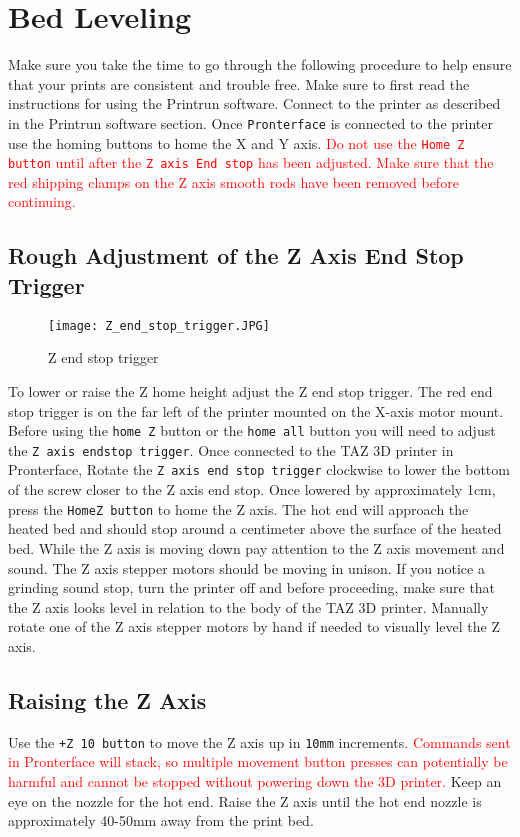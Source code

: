 \section{Bed Leveling}
Make sure you take the time to go through the following procedure to help ensure that your prints are consistent and trouble free. Make sure to first read the instructions for using the Printrun software. Connect to the printer as described in the Printrun software section. Once \texttt{Pronterface} is connected to the printer use the homing buttons to home the X and Y axis. \textcolor{red}{Do not use the \texttt{Home Z button} until after the \texttt{Z axis End stop} has been adjusted. Make sure that the red shipping clamps on the Z axis smooth rods have been removed before continuing.}

\subsection{Rough Adjustment of the Z Axis End Stop Trigger}
\begin{figure}[H]
\centering
\texttt{[image: Z\_end\_stop\_trigger.JPG]}
\caption{Z end stop trigger}
\label{fig:Z_end_stop_trigger}
\end{figure}
To lower or raise the Z home height adjust the Z end stop trigger. The red end stop trigger is on the far left of the printer mounted on the X-axis motor mount. Before using the \texttt{home Z} button or the \texttt{home all} button you will need to adjust the \texttt{Z axis endstop trigger}. Once connected to the TAZ 3D printer in Pronterface, Rotate the \texttt{Z axis end stop trigger} clockwise to lower the bottom of the screw closer to the Z axis end stop. Once lowered by approximately 1cm, press the \texttt{HomeZ button} to home the Z axis. The hot end will approach the heated bed and should stop around a centimeter above the surface of the heated bed. While the Z axis is moving down pay attention to the Z axis movement and sound. The Z axis stepper motors should be moving in unison. If you notice a grinding sound stop, turn the printer off and before proceeding, make sure that the Z axis looks level in relation to the body of the TAZ 3D printer. Manually rotate one of the Z axis stepper motors by hand if needed to visually level the Z axis.

\subsection{Raising the Z Axis}
Use the \texttt{+Z 10 button} to move the Z axis up in \texttt{10mm} increments. \textcolor{red}{Commands sent in Pronterface will stack, so multiple movement button presses can potentially be harmful and cannot be stopped without powering down the 3D printer.} Keep an eye on the nozzle for the hot end. Raise the Z axis until the hot end nozzle is approximately 40-50mm away from the print bed.

